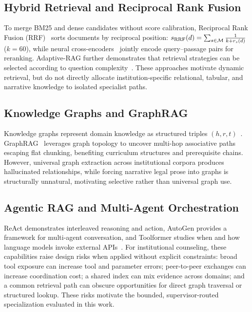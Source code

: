 \subsection{Hybrid Retrieval and Reciprocal Rank Fusion}
\label{sec:hybrid_rrf}

To merge BM25 and dense candidates without score calibration, Reciprocal Rank Fusion (RRF)~\cite{cormack2009rrf} sorts documents by reciprocal position: $s_{\mathrm{RRF}}(d) = \sum_{s \in \mathcal{M}} \frac{1}{k + r_s(d)}$ ($k = 60$), while neural cross-encoders~\cite{nogueira2019bert,xiao2023bge} jointly encode query--passage pairs for reranking. Adaptive-RAG further demonstrates that retrieval strategies can be selected according to question complexity~\cite{jeong2024adaptiverag}. These approaches motivate dynamic retrieval, but do not directly allocate institution-specific relational, tabular, and narrative knowledge to isolated specialist paths.

\subsection{Knowledge Graphs and GraphRAG}
\label{sec:kg_graphrag}

Knowledge graphs represent domain knowledge as structured triples $(h, r, t)$~\cite{pan2024unifying}. GraphRAG~\cite{edge2024graphrag} leverages graph topology to uncover multi-hop associative paths escaping flat chunking, benefiting curriculum structures and prerequisite chains. However, universal graph extraction across institutional corpora produces hallucinated relationships, while forcing narrative legal prose into graphs is structurally unnatural, motivating selective rather than universal graph use.

\subsection{Agentic RAG and Multi-Agent Orchestration}
\label{sec:agentic_multiagent}

ReAct demonstrates interleaved reasoning and action, AutoGen provides a framework for multi-agent conversation, and Toolformer studies when and how language models invoke external APIs~\cite{yao2023react,wu2023autogen,schick2023toolformer}. For institutional counseling, these capabilities raise design risks when applied without explicit constraints: broad tool exposure can increase tool and parameter errors; peer-to-peer exchanges can increase coordination cost; a shared index can mix evidence across domains; and a common retrieval path can obscure opportunities for direct graph traversal or structured lookup. These risks motivate the bounded, supervisor-routed specialization evaluated in this work.

